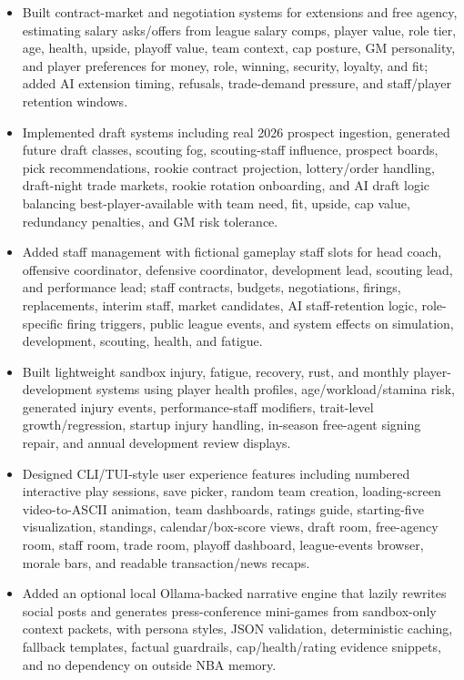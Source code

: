 \documentclass[10.5pt,letterpaper]{article}
\begin{document}
\begin{itemize}
\item Built contract-market and negotiation systems for extensions and free agency, estimating salary asks/offers from league salary comps, player value, role tier, age, health, upside, playoff value, team context, cap posture, GM personality, and player preferences for money, role, winning, security, loyalty, and fit; added AI extension timing, refusals, trade-demand pressure, and staff/player retention windows.
\item Implemented draft systems including real 2026 prospect ingestion, generated future draft classes, scouting fog, scouting-staff influence, prospect boards, pick recommendations, rookie contract projection, lottery/order handling, draft-night trade markets, rookie rotation onboarding, and AI draft logic balancing best-player-available with team need, fit, upside, cap value, redundancy penalties, and GM risk tolerance.
\item Added staff management with fictional gameplay staff slots for head coach, offensive coordinator, defensive coordinator, development lead, scouting lead, and performance lead; staff contracts, budgets, negotiations, firings, replacements, interim staff, market candidates, AI staff-retention logic, role-specific firing triggers, public league events, and system effects on simulation, development, scouting, health, and fatigue.
\item Built lightweight sandbox injury, fatigue, recovery, rust, and monthly player-development systems using player health profiles, age/workload/stamina risk, generated injury events, performance-staff modifiers, trait-level growth/regression, startup injury handling, in-season free-agent signing repair, and annual development review displays.
\item Designed CLI/TUI-style user experience features including numbered interactive play sessions, save picker, random team creation, loading-screen video-to-ASCII animation, team dashboards, ratings guide, starting-five visualization, standings, calendar/box-score views, draft room, free-agency room, staff room, trade room, playoff dashboard, league-events browser, morale bars, and readable transaction/news recaps.
\item Added an optional local Ollama-backed narrative engine that lazily rewrites social posts and generates press-conference mini-games from sandbox-only context packets, with persona styles, JSON validation, deterministic caching, fallback templates, factual guardrails, cap/health/rating evidence snippets, and no dependency on outside NBA memory.

\end{itemize}
\end{document}
